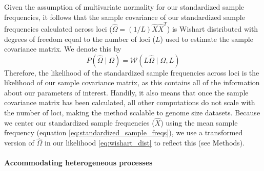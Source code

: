 \documentclass[12pt]{article}
\newcommand{\plrm}[1]{\todo[color=green!20]{#1}}
\newcommand{\plrm}[1]{\plr{#1}}
\newcommand{\gb}[1]{{\it\color{magenta}{(#1)}}}
\newcommand{\plr}[1]{{\it\color{green}{(#1)}}}
\begin{document}
Given the assumption of multivariate normality for our standardized sample frequencies, it follows that the sample covariance of our standardized sample frequencies calculated across loci ($ \widehat{\Omega} = (1/L)  \hat{X}\hat{X}^T$) is Wishart distributed with degrees of freedom equal to the number of loci ($L$) used to estimate the sample covariance matrix. We denote this by
\begin{equation}
\label{eq:wishart_dist}
P(\widehat{\Omega} \mid \Omega) = \mathcal{W}\left( L\widehat{\Omega} \mid \Omega,L \right)
\end{equation}
Therefore, the likelihood of the standardized sample frequencies across loci is the likelihood of our sample covariance matrix, as this contains all of the information about our parameters of interest.  \gb{Graham I feel like there's a way to say this last sentence better, but I'm not sure exactly what you're trying to say.} Handily, it also means that once the sample covariance matrix has been calculated, all other computations do not scale with the number of loci, making the method scalable to genome size datasets. Because we center our standardized sample frequencies ($\hat{X}$) using the mean sample frequency (equation \eqref{eq:standardized_sample_freqs}), we use a transformed version of $\widehat{\Omega} $ in our likelihood \eqref{eq:wishart_dist} to reflect this (see Methods).





\paragraph{Accommodating heterogeneous processes}
\end{document}
